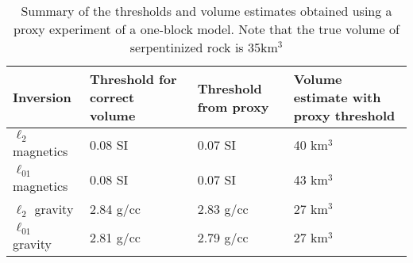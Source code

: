\begin{table}
    \centering
        \caption{Summary of the thresholds and volume estimates obtained using a proxy experiment of a one-block model. Note that the true volume of serpentinized rock is 35km$^3$}
        \begin{tabular}[htb]{| p{2.5cm} | p{3.25cm} | p{3.25cm} | p{4.5cm} |}
            \hline
            \textbf{Inversion} & \textbf{Threshold for correct volume} & \textbf{Threshold from proxy} & \textbf{Volume estimate with proxy threshold} \\
            \hline
            $\ell_2$  magnetics & 0.08 SI & 0.07 SI & 40 km$^3$ \\
            $\ell_{01}$ magnetics & 0.08 SI & 0.07 SI & 43 km$^3$ \\
            \hline
            $\ell_2$  gravity & 2.84 g/cc & 2.83 g/cc & 27 km$^3$ \\
            $\ell_{01}$ gravity & 2.81 g/cc & 2.79 g/cc & 27 km$^3$ \\
            \hline
        \end{tabular}
        \label{tab:volume-estimates-summary}
     \end{table}


